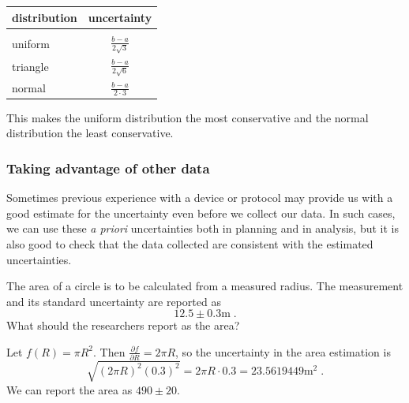 \documentclass[twoside]{book}\usepackage[]{graphicx}\usepackage[]{xcolor}
\newcommand{\Partial}[2]{\frac{\partial #1}{\partial #2}}
\begin{document}
\begin{center}
	\begin{tabular}{lc}
		\hline
		distribution & uncertainty
		\\
		\hline
		\\[-3mm]
		uniform & $\displaystyle \frac{b-a}{2 \sqrt{3}}$
		\\[5mm]
		triangle & $\displaystyle \frac{b-a}{2 \sqrt{6}}$
		\\[5mm]
		normal & $\displaystyle \frac{b-a}{2 \cdot 3}$
		\\[3mm]
		\hline
	\end{tabular}
\end{center}
This makes the uniform distribution the most conservative and the normal distribution the least conservative.


\subsubsection{Taking advantage of other data}

Sometimes previous experience with a device or protocol may provide us with a good 
estimate for the uncertainty even before we collect our data.  In such cases, we can 
use these \emph{a priori} uncertainties both in planning and in analysis, but it is also
good to check that the data collected are consistent with the estimated uncertainties.


\begin{problem}
The area of a circle is to be calculated from a measured radius.  The measurement and its
standard uncertainty are reported as 
\[
12.5 \pm 0.3 \mbox{m} \;.
\]
What should the researchers report as the area?
\end{problem}

\begin{solution}
Let $f(R) = \pi R^2$.  Then $\Partial{f}{R} = 2\pi R$, so the uncertainty in the area estimation
is 
\[
\sqrt{ (2 \pi R)^2 (0.3)^2 } = 2 \pi R \cdot 0.3  = 23.5619449 
\mathrm{m}^2
\;.
\]
We can report the area as 
$490 \pm 20$.
\end{solution}
\end{document}
